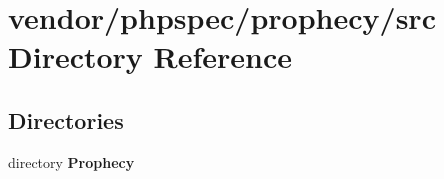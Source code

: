 \section{vendor/phpspec/prophecy/src Directory Reference}
\label{dir_3ce5b380a2459cf444797194d02ce78f}
\subsection*{Directories}
\begin{DoxyCompactItemize}
\item 
directory {\bf Prophecy}
\end{DoxyCompactItemize}
